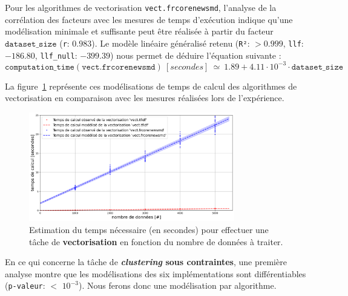 			Pour les algorithmes de vectorisation \texttt{vect.frcorenewsmd}, l'analyse de la corrélation des facteurs avec les mesures de temps d'exécution indique qu'une modélisation minimale et suffisante peut être réalisée à partir du facteur $\texttt{dataset\_size}$ (\texttt{r}: $0.983$).
			Le modèle linéaire généralisé retenu (\texttt{R²}: $> 0.999$, \texttt{llf}: $-186.80$, \texttt{llf\_null}: $-399.39$) nous permet de déduire l'équation suivante :
			\begin{equation}
				\texttt{computation\_time}(\texttt{vect.frcorenewsmd})~[secondes]~
				\simeq~1.89 + 4.11 \cdot 10^{-3} \cdot \texttt{dataset\_size}
			\end{equation}
			
			La figure~\ref{figure:4.3.2-ETUDE-COUTS-TEMPS-CALCUL-MODELISATION-VECTORIZATION} représente ces modélisations de temps de calcul des algorithmes de vectorisation en comparaison avec les mesures réalisées lors de l'expérience.
			\newline
			\begin{figure}[!htb]
				\centering
				\includegraphics[width=0.8\textwidth]{figures/etude-temps-calcul-modelisation-2vect}
				\caption{Estimation du temps nécessaire (en secondes) pour effectuer une tâche de \textbf{vectorisation} en fonction du nombre de données à traiter.}
				\label{figure:4.3.2-ETUDE-COUTS-TEMPS-CALCUL-MODELISATION-VECTORIZATION}
			\end{figure}
			
			
			En ce qui concerne la tâche de \textbf{\textit{clustering} sous contraintes}, une première analyse montre que les modélisations des six implémentations sont différentiables  (\texttt{p-valeur}: $<$ \texttt{$10^{-3}$}). Nous ferons donc une modélisation par algorithme.
			
